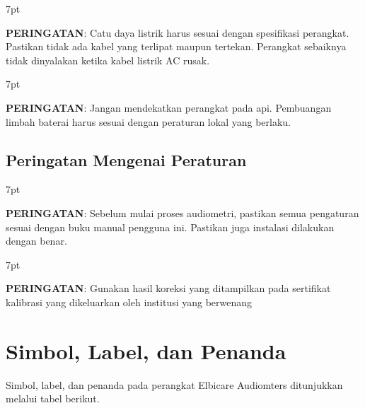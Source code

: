 \documentclass[11pt,a4paper,twoside,onecolumn]{book}
\newenvironment{formalred}{%
	\def\FrameCommand{%
		\hspace{1pt}%
		{\color{red}\vrule width 2pt}%
		{\color{formalshade}\vrule width 4pt}%
		\colorbox{formalshade}%
	}%
	\MakeFramed{\advance\hsize-\width\FrameRestore}%
	\noindent\hspace{-4.55pt}%
	\begin{adjustwidth}{}{7pt}%
		\vspace{2pt}\vspace{2pt}%
	}
	{%
		\vspace{2pt}\end{adjustwidth}\endMakeFramed%
}
\begin{document}
				\begin{formalred}
					\raisebox{0.125ex}{\resizebox{!}{2ex}{\danger}} \textbf{PERINGATAN}: 
					Catu daya listrik harus sesuai dengan spesifikasi perangkat. Pastikan tidak ada kabel yang terlipat maupun tertekan. Perangkat sebaiknya tidak dinyalakan ketika kabel listrik AC rusak. 
				\end{formalred}
				
				\begin{formalred}
					\raisebox{0.125ex}{\resizebox{!}{2ex}{\danger}} \textbf{PERINGATAN}: 
					Jangan mendekatkan perangkat pada api. Pembuangan limbah baterai harus sesuai dengan peraturan lokal yang berlaku.
				\end{formalred}
			
			\subsection{Peringatan Mengenai Peraturan}
				\begin{formalred}
					\raisebox{0.125ex}{\resizebox{!}{2ex}{\danger}} \textbf{PERINGATAN}: 
					Sebelum mulai proses audiometri, pastikan semua pengaturan sesuai dengan buku manual pengguna ini. Pastikan juga instalasi dilakukan dengan benar.
				\end{formalred}
				
				\begin{formalred}
					\raisebox{0.125ex}{\resizebox{!}{2ex}{\danger}} \textbf{PERINGATAN}: 
					Gunakan hasil koreksi yang ditampilkan pada sertifikat kalibrasi yang dikeluarkan oleh institusi yang berwenang
				\end{formalred}	
			
		\section{Simbol, Label, dan Penanda}
		Simbol, label, dan penanda pada perangkat Elbicare Audiomters ditunjukkan melalui tabel berikut.
		
\end{document}
